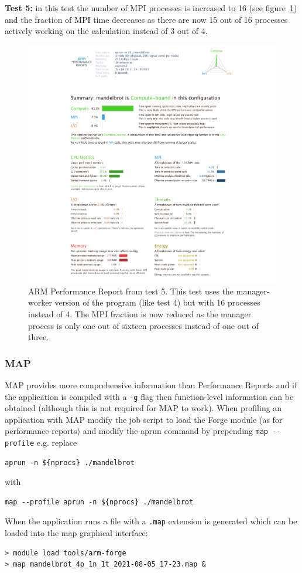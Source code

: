 \documentclass[a4paper,titlepage]{article}
\begin{document}
\noindent
\textbf{Test 5:} in this test the number of MPI processes is increased to 16 (see figure~\ref{fig:perf-report_MB3_16procs}) and the fraction of MPI time decreases as there are now 15 out of 16 processes actively working on the calculation instead of 3 out of 4.
\begin{figure}[htbp]
\begin{center}
\includegraphics[scale=0.35]{figures/mandelbrot_v3_16procs_PerformanceReport}
\caption{ARM Performance Report from test 5. This test uses the manager-worker version of the program (like test 4) but with 16 processes instead of 4. The MPI fraction is now reduced as the manager process is only one out of sixteen processes instead of one out of three.}
\label{fig:perf-report_MB3_16procs}
\end{center}
\end{figure}

\subsubsection{MAP}

MAP provides more comprehensive information than Performance Reports and if the application is compiled with a \verb+-g+ flag then function-level information can be obtained (although this is not required for MAP to work). When profiling an application with MAP modify the job script to load the Forge module (as for performance reports) and modify the aprun command by prepending \verb+map --profile+ e.g. replace
\begin{verbatim}
aprun -n ${nprocs} ./mandelbrot
\end{verbatim}
with
\begin{verbatim}
map --profile aprun -n ${nprocs} ./mandelbrot
\end{verbatim}
When the application runs a file with a \verb+.map+ extension is generated which can be loaded into the map graphical interface:
\begin{verbatim}
> module load tools/arm-forge
> map mandelbrot_4p_1n_1t_2021-08-05_17-23.map &
\end{verbatim}
\end{document}
